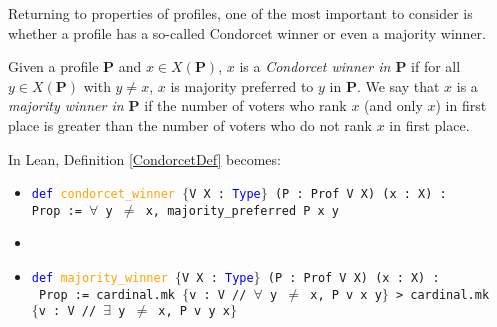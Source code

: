 \documentclass[runningheads]{llncs}
\begin{document}
Returning to properties of profiles, one of the most important to consider is whether a profile has a so-called Condorcet winner or even a majority winner.

\begin{definition}\label{CondorcetDef} \textnormal{Given a profile $\mathbf{P}$ and $x\in X(\mathbf{P})$, $x$ is a \textit{Condorcet winner in $\mathbf{P}$} if for all $y\in X(\mathbf{P})$ with $y\neq x$, $x$ is majority preferred to $y$ in $\mathbf{P}$. We say that $x$ is a \textit{majority winner in $\mathbf{P}$} if the number of voters who rank $x$ (and only $x$) in first place is greater than the number of voters who do not rank $x$ in first place.}
\end{definition}
In Lean, Definition \ref{CondorcetDef} becomes:

\begin{itemize}
\item[] \texttt{\textcolor{blue}{def} \textcolor{orange}{condorcet\_winner} $\{$V X : \textcolor{blue}{Type}$\}$ (P : Prof V X) (x : X) :} \\ \texttt{Prop := $\forall$ y $\neq$ x, majority\_preferred P x y}
\item[]
\item[] \texttt{\textcolor{blue}{def} \textcolor{orange}{majority\_winner} $\{$V X : \textcolor{blue}{Type}$\}$ (P : Prof V X) (x : X) :} \\
\texttt{ Prop := cardinal.mk $\{$v : V // $\forall$ y $\neq$ x, P v x y$\}$ > cardinal.mk} \\ \texttt{$\{$v : V // $\exists$ y $\neq$ x, P v y x$\}$}
\end{itemize}
\end{document}

